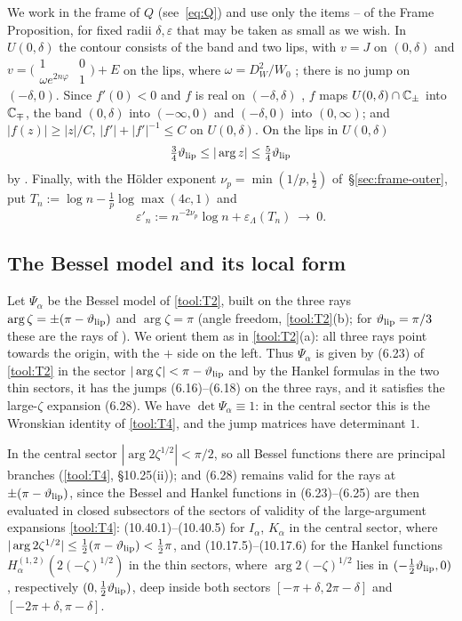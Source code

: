 We work in the frame of $Q$ (see~\eqref{eq:Q}) and use only the items -- of the Frame Proposition, for fixed
radii $\delta,\varepsilon$ that may be taken as small as we wish. In $U(0,\delta)$ the contour consists of the band and
two lips, with $v=J$ on $(0,\delta)$ and $v=\bigl(\begin{smallmatrix}1&0\\\omega e^{2n\varphi}&1\end{smallmatrix}\bigr)+E$ on
the lips, where $\omega=D_W^2/W_0$ ; there is no jump on $(-\delta,0)$. Since $f'(0)<0$ and $f$ is real on
$(-\delta,\delta)$ , $f$ maps $U(0,\delta)\cap\mathbb{C}_\pm$ into $\mathbb{C}_\mp$, the band $(0,\delta)$ into $(-\infty,0)$ and
$(-\delta,0)$ into $(0,\infty)$; and $|f(z)|\ge|z|/C$, $|f'|+|f'|^{-1}\le C$ on $U(0,\delta)$. On the lips in $U(0,\delta)$
\begin{equation}\label{eq:he-lipangle}
  \tfrac34\vartheta_{\mathrm{lip}}\le|\arg z|\le\tfrac54\vartheta_{\mathrm{lip}}
\end{equation}
by . Finally, with the H\"older exponent $\nu_p=\min(1/p,\frac12)$ of~\S\ref{sec:frame-outer}, put
$T_n:=\log n-\frac1p\log\max(4c,1)$ and
\begin{equation}\label{eq:he-epsprime}
  \varepsilon'_n:=n^{-2\nu_p}\log n+\varepsilon_\Lambda(T_n)\ \longrightarrow\ 0 .
\end{equation}

\subsection{The Bessel model and its local form}\label{sec:he-model}

Let $\Psi_\alpha$ be the Bessel model of \ref{tool:T2}, built on the three rays $\arg\zeta=\pm(\pi-\vartheta_{\mathrm{lip}})$ and
$\arg\zeta=\pi$ (angle freedom, \ref{tool:T2}(b); for $\vartheta_{\mathrm{lip}}=\pi/3$ these are the rays of \cite[\S6]{KMVV}). We orient them
as in \ref{tool:T2}(a): all three rays point towards the origin, with the $+$ side on the left. Thus $\Psi_\alpha$ is given by (6.23) of \ref{tool:T2} in the sector
$|\arg\zeta|<\pi-\vartheta_{\mathrm{lip}}$ and by the Hankel formulas in the two thin sectors, it has the jumps (6.16)--(6.18) on the
three rays, and it satisfies the large-$\zeta$ expansion (6.28). We have $\det\Psi_\alpha\equiv1$: in the central
sector this is the Wronskian identity of \ref{tool:T4}, and the jump matrices have determinant $1$.

In the central sector $|\arg2\zeta^{1/2}|<\pi/2$, so all Bessel functions there are principal branches
(\ref{tool:T4}, \S10.25(ii)); and (6.28) remains valid for the rays at $\pm(\pi-\vartheta_{\mathrm{lip}})$, since the Bessel and
Hankel functions in (6.23)--(6.25) are then evaluated in closed subsectors of the sectors of validity of the
large-argument expansions \ref{tool:T4}: (10.40.1)--(10.40.5) for $I_\alpha$, $K_\alpha$ in the central sector, where
$|\arg2\zeta^{1/2}|\le\frac12(\pi-\vartheta_{\mathrm{lip}})<\frac12\pi$, and (10.17.5)--(10.17.6) for the Hankel functions
$H^{(1,2)}_\alpha(2(-\zeta)^{1/2})$ in the thin sectors, where $\arg2(-\zeta)^{1/2}$ lies in $(-\frac12\vartheta_{\mathrm{lip}},0)$,
respectively $(0,\frac12\vartheta_{\mathrm{lip}})$, deep inside both sectors $[-\pi+\delta,2\pi-\delta]$ and
$[-2\pi+\delta,\pi-\delta]$.

